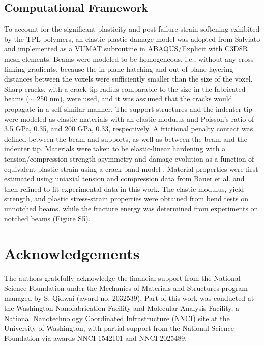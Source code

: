 \documentclass[11pt]{article}
\begin{document}
    \subsection*{Computational Framework}
        To account for the significant plasticity and post-failure strain softening exhibited by the TPL polymers, an elastic-plastic-damage model was adopted from Salviato \cite{salviato2022adding} and implemented as a VUMAT subroutine in ABAQUS/Explicit with C3D8R mesh elements.  
        Beams were modeled to be homogeneous, i.e., without any cross-linking gradients, because the in-plane hatching and out-of-plane layering distances between the voxels were sufficiently smaller than the size of the voxel.
        Sharp cracks, with a crack tip radius comparable to the size in the fabricated beams ($\sim$ 250 nm), were used, and it was assumed that the cracks would propagate in a self-similar manner.
        The support structures and the indenter tip were modeled as elastic materials with an elastic modulus and Poisson's ratio of 3.5 GPa, 0.35, and 200 GPa, 0.33, respectively.
        A frictional penalty contact was defined between the beam and supports, as well as between the beam and the indenter tip.
        Materials were taken to be elastic-linear hardening with a tension/compression strength asymmetry and damage evolution as a function of equivalent plastic strain using a crack band model \cite{qiao2019strength, qiao2020micro}.
        Material properties were first estimated using uniaxial tension and compression data from Bauer et al. \cite{bauer2019programmable, bauer2020thermal} and then refined to fit experimental data in this work.
        The elastic modulus, yield strength, and plastic stress-strain properties were obtained from bend tests on unnotched beams, while the fracture energy was determined from experiments on notched beams (Figure S5).

    \section*{Acknowledgements}
    The authors gratefully acknowledge the financial support from the National Science Foundation under the Mechanics of Materials and Structures program managed by S. Qidwai (award no. 2032539).
    Part of this work was conducted at the Washington Nanofabrication Facility and Molecular Analysis Facility, a National Nanotechnology Coordinated Infrastructure (NNCI) site at the University of Washington, with partial support from the National Science Foundation via awards NNCI-1542101 and NNCI-2025489.
\end{document}

